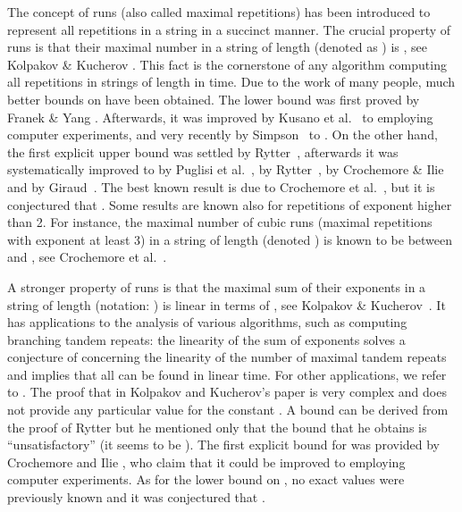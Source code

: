 \documentclass{llncs}
\begin{document}
    The concept of runs (also called maximal repetitions) has been introduced to
    represent all repetitions in a string in a succinct manner.
    The crucial property of runs is that their maximal number in a string of
    length  (denoted as ) is , see Kolpakov \& Kucherov \cite{KolpakovKucherov}.
    This fact is the cornerstone of any algorithm computing all repetitions in
    strings of length  in  time.
    Due to the work of many people, much better bounds on  have been obtained.
    The lower bound  was first proved by Franek \& Yang \cite{Franek08}.
    Afterwards, it was improved by Kusano et al.~\cite{Matsubara} to  employing computer experiments, 
    and very recently by Simpson~\cite{Simpson10} to .
    On the other hand, the first explicit upper bound  was settled by Rytter~\cite{Rytter06}, 
    afterwards it was systematically improved to  by Puglisi et al.~\cite{Puglisi08},
     by Rytter~\cite{Rytter07},
     by Crochemore \& Ilie~\cite{CrochemoreIlie,Crochemore08} and  by Giraud~\cite{Giraud08}.
    The best known result  is due to Crochemore et 
    al.~\cite{DBLP:conf/cpm/CrochemoreIT08}, but it is conjectured
    \cite{KolpakovKucherov} that .
    Some results are known also for repetitions of exponent higher than 2.
    For instance, the maximal number of cubic runs (maximal repetitions with exponent at least 3)
    in a string of length  (denoted ) is known to be between  and ,
    see Crochemore et al.~\cite{Lata10}.

    A stronger property of runs is that the maximal sum of their exponents in a string
    of length  (notation: ) is linear in terms of , see Kolpakov \& Kucherov~\cite{KolpakovKucherovLORIA}.
    It has applications to the analysis of various algorithms, such as
    computing branching tandem repeats: the linearity of the sum of exponents
    solves a conjecture of \cite{Gusfield98} concerning the linearity of the number of maximal
    tandem repeats and implies that all can be found in linear time.
    For other applications, we refer to \cite{KolpakovKucherovLORIA}.
    The proof that  in Kolpakov and Kucherov's paper \cite{KolpakovKucherovLORIA} is very complex
    and does not provide any particular value for the constant .
    A bound can be derived from the proof of Rytter \cite{Rytter06} but he mentioned only
    that the bound that he obtains is ``unsatisfactory'' (it seems to be ).
    The first explicit bound  for  was provided by Crochemore and Ilie \cite{Crochemore08},
    who claim that it could be improved to  employing computer experiments.
    As for the lower bound on , no exact values were previously known and
    it was conjectured \cite{Kolpakov99,KolpakovKucherovLORIA} that .
\end{document}
